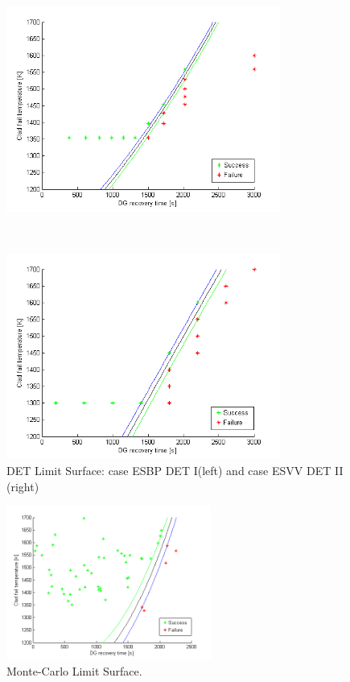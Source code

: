 \documentclass{mc2013}
\begin{document}
\begin{figure}
 \begin{minipage}[b]{8.5cm}
   \centering
   \includegraphics[width=9cm]{figures/DET_LS_pb.png}
 \end{minipage}
 \ \hspace{2mm} \hspace{3mm} \
 \begin{minipage}[b]{8.5cm}
  \centering
   \includegraphics[width=9cm]{figures/DET_LS_var.png}
 \end{minipage}
\caption{DET Limit Surface: case ESBP DET I(left) and case  ESVV DET II (right)}
\label{fig:DET_LS}
\end{figure}
\begin{figure}[h]
   \centering
    \includegraphics[width=0.6\textwidth]{figures/MC.png}
    \caption{Monte-Carlo Limit Surface.}
    \label{fig:MonteCarloLS}
\end{figure}
\end{document}
